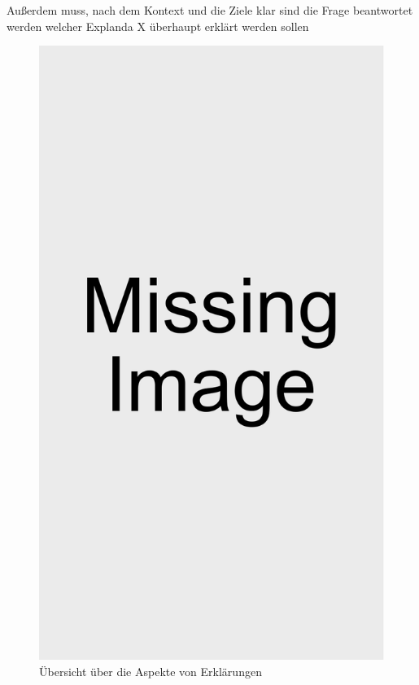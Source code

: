 Außerdem muss, nach dem Kontext und die Ziele klar sind die Frage beantwortet werden welcher Explanda X überhaupt erklärt werden sollen \cite{kohl_explainability_2019}

\newpage

\begin{figure}
    \includegraphics[width=0.2\linewidth]{contents/res/missing_image.pdf}
    \caption{Übersicht über die Aspekte von Erklärungen}
    \label{fig:model_overview_all}
\end{figure}







